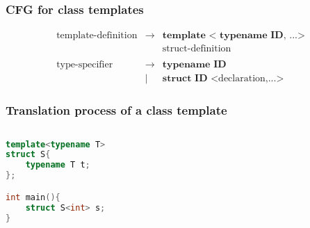 \documentclass{beamer}
\begin{document}
\begin{frame}
    \frametitle{CFG for class templates}

    \begin{eqnarray*}
        \text{template-definition} & \rightarrow & \textbf{template} \textbf{ < typename ID, ...>} \\
        &  & \text{struct-definition}\\
        \\
        \text{type-specifier} & \rightarrow & \textbf{typename ID}\\
        & | & \textbf{struct ID <}\text{declaration,...}\textbf{>}
    \end{eqnarray*}

\end{frame}

\begin{frame}[fragile]
    \frametitle{Translation process of a class template}

    \begin{columns}
        \begin{column}[]{0.5\textwidth}
            \small
            \begin{lstlisting}[language=C++]
template<typename T>
struct S{
    typename T t;
};

int main(){
    struct S<int> s;
}
                \end{lstlisting}
        \end{column}

    \end{columns}

\end{frame}
\end{document}
